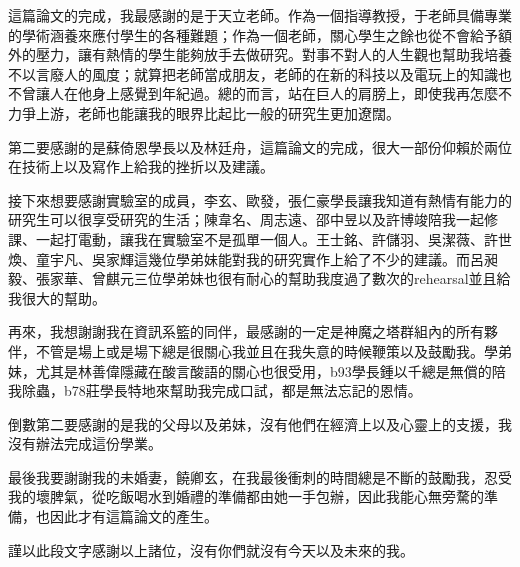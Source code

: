 \begin{acknowledgementsCH}

\setlength{\baselineskip}{1.5em}
這篇論文的完成，我最感謝的是于天立老師。作為一個指導教授，于老師具備專業的學術涵養來應付學生的各種難題；作為一個老師，關心學生之餘也從不會給予額外的壓力，讓有熱情的學生能夠放手去做研究。對事不對人的人生觀也幫助我培養不以言廢人的風度；就算把老師當成朋友，老師的在新的科技以及電玩上的知識也不曾讓人在他身上感覺到年紀過。總的而言，站在巨人的肩膀上，即使我再怎麼不力爭上游，老師也能讓我的眼界比起比一般的研究生更加遼闊。

第二要感謝的是蘇倚恩學長以及林廷舟，這篇論文的完成，很大一部份仰賴於兩位在技術上以及寫作上給我的挫折以及建議。

接下來想要感謝實驗室的成員，李玄、歐發，張仁豪學長讓我知道有熱情有能力的研究生可以很享受研究的生活；陳韋名、周志遠、邵中昱以及許博竣陪我一起修課、一起打電動，讓我在實驗室不是孤單一個人。王士銘、許儲羽、吳潔薇、許世煥、童宇凡、吳家輝這幾位學弟妹能對我的研究實作上給了不少的建議。而呂昶毅、張家華、曾麒元三位學弟妹也很有耐心的幫助我度過了數次的rehearsal並且給我很大的幫助。

再來，我想謝謝我在資訊系籃的同伴，最感謝的一定是神魔之塔群組內的所有夥伴，不管是場上或是場下總是很關心我並且在我失意的時候鞭策以及鼓勵我。學弟妹，尤其是林善偉隱藏在酸言酸語的關心也很受用，b93學長鍾以千總是無償的陪我除蟲，b78莊學長特地來幫助我完成口試，都是無法忘記的恩情。

倒數第二要感謝的是我的父母以及弟妹，沒有他們在經濟上以及心靈上的支援，我沒有辦法完成這份學業。

最後我要謝謝我的未婚妻，饒卿玄，在我最後衝刺的時間總是不斷的鼓勵我，忍受我的壞脾氣，從吃飯喝水到婚禮的準備都由她一手包辦，因此我能心無旁騖的準備，也因此才有這篇論文的產生。

謹以此段文字感謝以上諸位，沒有你們就沒有今天以及未來的我。

\end{acknowledgementsCH}
